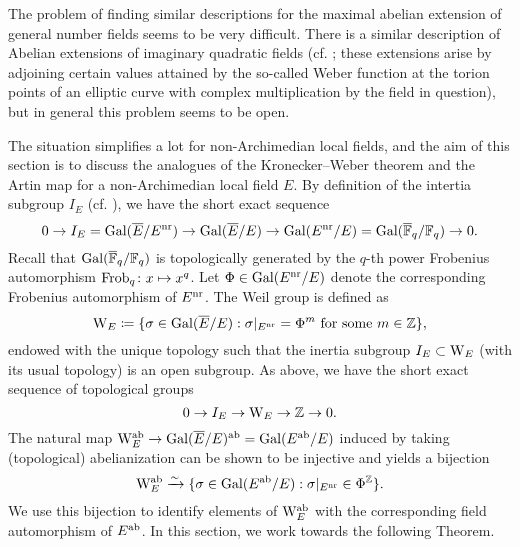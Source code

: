 \documentclass[../main.tex]{subfiles}
\begin{document}
The problem of finding similar descriptions for the maximal abelian extension of
general number fields seems to be very difficult. There is a similar description 
of Abelian extensions of imaginary quadratic fields (cf. \cite[Chapter II,
§5]{silverman1994advanced}; these extensions arise by adjoining certain values attained
by the so-called Weber function at the torion points of an elliptic curve with complex
multiplication by the field in question), but in general this problem seems to be open.

The situation simplifies a lot for non-Archimedian local fields, and
the aim of this section is to discuss the analogues of the Kronecker--Weber
theorem and the Artin map for a non-Archimedian local field $E$.
By definition of the intertia subgroup $I_E$ (cf. \cite[Kapitel
2]{neukirch2006algebraische}), we have the short exact sequence
\begin{equation*}
  0 \to I_E = \operatorname{Gal}(\overline E/ E^{\mathrm{nr}}) \to \operatorname{Gal}(\overline E/E) \to \operatorname{Gal}(E^{\mathrm{nr}} /E) =
  \operatorname{Gal}(\overline {\mathbb{F}}_q /\mathbb{F}_q) \to 0.
\end{equation*}
Recall that $\operatorname{Gal}({\overline {\mathbb{F}}_q}/\mathbb{F}_q)$ is topologically generated by the $q$-th power
Frobenius automorphism $\mathrm{Frob}_q\colon x \mapsto x^q$. Let $\Phi \in \operatorname{Gal}(E^{\mathrm{nr}} /E)$ 
denote the corresponding Frobenius automorphism of $E^{\mathrm{nr}}$. 
The Weil group is defined as
\begin{equation*}
  \mathrm W_E \coloneq \{\sigma \in \operatorname{Gal}(\overline E/E) : \sigma|_{E^{\mathrm{nr}}} = \Phi^m
  \text{ for some } m \in \mathbb{Z}\},
\end{equation*}
endowed with the unique topology such that the inertia subgroup $I_E \subset
\mathrm W_E$ (with its usual topology) is an open subgroup.
As above, we have the short exact sequence of topological groups
\begin{equation*}
  0 \to I_E \to \mathrm W_E \to \mathbb{Z} \to 0.
\end{equation*}
The natural map $\mathrm W_E^{\mathrm{ab}} \to \operatorname{Gal}(\overline E/E)^{\mathrm{ab}} = \operatorname{Gal}(E^{\mathrm{ab}}/E)$ induced by taking
(topological) abelianization can be shown to be injective and yields a bijection
\begin{equation}\label{eq:WeilgroupInjectsIntoGalois}
  \mathrm W_E^{\mathrm{ab}} \xrightarrow{\sim} \{\sigma \in \operatorname{Gal}(E^{\mathrm{ab}}/E) : \sigma|_{E^{\mathrm{nr}}} \in \Phi^{\mathbb{Z}}\}.
\end{equation}
We use this bijection to identify elements of $\mathrm W_E^{\mathrm{ab}}$ with the corresponding field
automorphism of $E^{\mathrm{ab}}$. In this section, we work towards the following Theorem.
\end{document}
